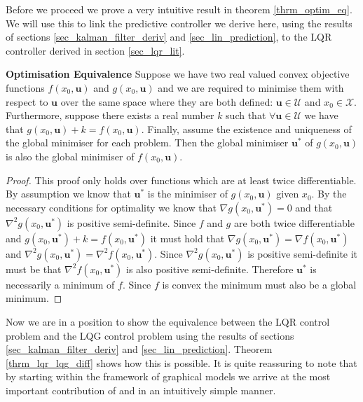 Before we proceed we prove a very intuitive result in theorem \ref{thrm_optim_eq}. We will use this to link the predictive controller we derive here, using the results of sections \ref{sec_kalman_filter_deriv} and \ref{sec_lin_prediction}, to the LQR controller derived in section \ref{sec_lqr_lit}.
\begin{thrm}
\textbf{Optimisation Equivalence} Suppose we have two real valued convex objective functions $f(x_0,\mathbf{u})$ and $g(x_0, \mathbf{u})$ and we are required to minimise them with respect to $\mathbf{u}$ over the same space where they are both defined: $\mathbf{u}\in \mathcal{U}$ and $x_0 \in \mathcal{X}$. Furthermore, suppose there exists a real number $k$ such that $\forall \mathbf{u} \in \mathcal{U}$ we have that $g(x_0, \mathbf{u}) + k = f(x_0, \mathbf{u})$. Finally, assume the existence and uniqueness of the global minimiser for each problem. Then the global minimiser $\mathbf{u}^*$ of $g(x_0, \mathbf{u})$ is also the global minimiser of $f(x_0, \mathbf{u})$.
\label{thrm_optim_eq}
\end{thrm}
\begin{proof}
This proof only holds over functions which are at least twice differentiable. By assumption we know that $\mathbf{u}^*$ is the minimiser of $g(x_0, \mathbf{u})$ given $x_0$. By the necessary conditions for optimality \cite{forst} we know that $\nabla g(x_0, \mathbf{u}^*) = 0$ and that $\nabla ^2 g(x_0, \mathbf{u}^*)$ is positive semi-definite. Since $f$ and $g$ are both twice differentiable and  $g(x_0, \mathbf{u}^*) + k = f(x_0, \mathbf{u}^*)$ it must hold that $\nabla g(x_0, \mathbf{u}^*) = \nabla f(x_0, \mathbf{u}^*)$ and  $\nabla ^2 g(x_0, \mathbf{u}^*) = \nabla ^2 f(x_0, \mathbf{u}^*)$. Since $\nabla ^2 g(x_0, \mathbf{u}^*)$ is positive semi-definite it must be that $\nabla ^2 f(x_0, \mathbf{u}^*)$ is also positive semi-definite. Therefore $\mathbf{u}^*$ is necessarily a minimum of $f$. Since $f$ is convex the minimum must also be a global minimum.
\end{proof}
Now we are in a position to show the equivalence between the LQR control problem and the LQG control problem using the results of sections \ref{sec_kalman_filter_deriv} and \ref{sec_lin_prediction}. Theorem \ref{thrm_lqr_lqg_diff} shows how this is possible. It is quite reassuring to note that by starting within the framework of graphical models we arrive at the most important contribution of \cite{yan1} and \cite{yan2} in an intuitively simple manner.
